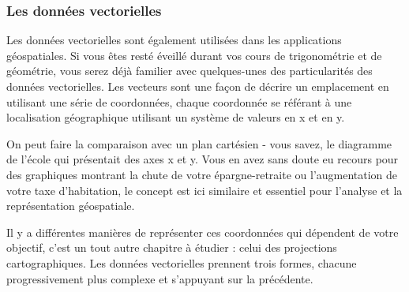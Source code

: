 \subsubsection{Les données vectorielles}\label{label_vectordata}

Les données vectorielles sont également utilisées dans les applications géospatiales. Si vous êtes resté éveillé durant vos cours de trigonométrie et de géométrie, vous serez déjà familier avec quelques-unes des particularités des données vectorielles. Les vecteurs sont une façon de décrire un emplacement en utilisant une série de coordonnées, chaque coordonnée se référant à une localisation géographique utilisant un système de valeurs en x et en y.

On peut faire la comparaison avec un plan cartésien - vous savez, le diagramme de l'école qui présentait des axes x et y. Vous en avez sans doute eu recours pour des graphiques montrant la chute de votre épargne-retraite ou l'augmentation de votre taxe d'habitation, le concept est ici similaire et essentiel pour l'analyse et la représentation géospatiale.

Il y a différentes manières de représenter ces coordonnées qui dépendent de votre objectif, c'est un tout autre chapitre à étudier : celui des projections cartographiques.
Les données vectorielles prennent trois formes, chacune progressivement plus complexe et s'appuyant sur la précédente.  


